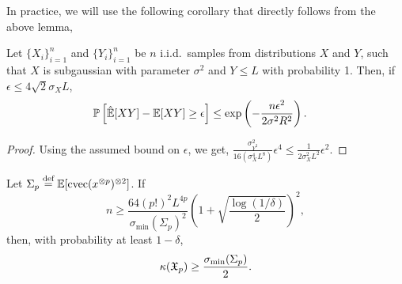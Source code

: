 \documentclass[tablecaption=bottom]{jmlr}
\newcommand\eqdef{\ensuremath{\stackrel{\textrm{def}}{=}}} %
\newcommand\sigmamin{\sigma_\textrm{min}}
\DeclareMathOperator{\cvec} {cvec}
\begin{document}
In practice, we will use the following corollary that directly follows from the above lemma,
\begin{corollary}
  Let $\{X_i\}_{i=1}^n$ and $\{Y_i\}_{i=1}^n$ be $n$ i.i.d.\
  samples from distributions $X$ and $Y$, such that $X$ is subgaussian with parameter
  $\sigma^2$ and $Y \le L$ with probability 1. Then, if $\epsilon \le 4\sqrt{2} \sigma_X L$,
  \begin{align}
    \mathbb{P}\left[ \hat{\operatorname{\mathbb{E}}}[ X Y ] - \operatorname{\mathbb{E}}[ X Y ] \ge \epsilon \right] 
    &\le \exp\left( - \frac{n \epsilon^2}{2 \sigma^2 R^2 } \right).
  \end{align}
\end{corollary}
\begin{proof}
  Using the assumed bound on $\epsilon$, we get,
  $\frac{\sigma^2_{Y^2}}{16 (\sigma^4_X L^8)} \epsilon^{4} \le \frac{1}{2\sigma^2_X L^2} \epsilon^{2}$.
\end{proof}

\begin{lemma}
\label{lem:lowRankLower}
Let $\Sigma_p \eqdef \E[\cvec(x\tp{p})\tp{2}]$.
If $$n \ge \frac{64 (p!)^2 L^{4p}}{\sigmamin(\Sigma_p)^2} \left(1 + \sqrt{\frac{\log(1/\delta)}{2}}\right)^2,$$
then, with probability at least $1-\delta$,
$$\kappa(\opX_p) \ge \frac{\sigmamin(\Sigma_p)}{2}.$$
\end{lemma}
\end{document}
